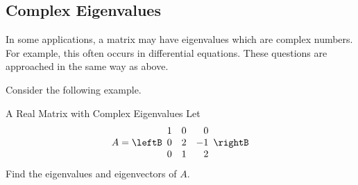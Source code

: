\subsection{Complex Eigenvalues}

In some applications, a matrix may have eigenvalues
 which are complex numbers. For example, this often occurs in
differential equations. These questions are approached in the same way as above.

Consider the following example.

\begin{example}{A Real Matrix with Complex Eigenvalues}\label{exa:realmatrixcomplexeigenvalues}
Let 
\begin{equation*}
A=\leftB
\begin{array}{rrr}
1 & 0 &  0 \\
0 & 2 & -1 \\
0 & 1 &  2
\end{array}
\rightB 
\end{equation*}
Find the eigenvalues and eigenvectors of $A$.
\end{example}


